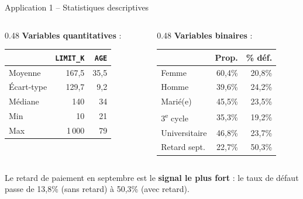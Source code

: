 \documentclass[11pt,aspectratio=169]{beamer}
\begin{document}
\begin{frame}{Application 1 -- Statistiques descriptives}

\begin{columns}[T]
\begin{column}{0.48\textwidth}
\textbf{Variables quantitatives} :
\smallskip

    \small
    \renewcommand{\arraystretch}{1.2}
    \begin{tabular}{lrr}
        \toprule
        & \texttt{LIMIT\_K} & \texttt{AGE} \\
        \midrule
        Moyenne & 167,5 & 35,5 \\
        Écart-type & 129,7 & 9,2 \\
        Médiane & 140 & 34 \\
        Min & 10 & 21 \\
        Max & 1\,000 & 79 \\
        \bottomrule
    \end{tabular}
\end{column}
\begin{column}{0.48\textwidth}
\textbf{Variables binaires} :
\smallskip

    \small
    \renewcommand{\arraystretch}{1.2}
    \begin{tabular}{lrr}
        \toprule
        & \textbf{Prop.} & \textbf{\% déf.} \\
        \midrule
        Femme & 60,4\% & 20,8\% \\
        Homme & 39,6\% & 24,2\% \\
        Marié(e) & 45,5\% & 23,5\% \\
        3\textsuperscript{e} cycle & 35,3\% & 19,2\% \\
        Universitaire & 46,8\% & 23,7\% \\
        Retard sept. & 22,7\% & 50,3\% \\
        \bottomrule
    \end{tabular}
\end{column}
\end{columns}

\bigskip

Le retard de paiement en septembre est le \textbf{signal le plus fort} :
le taux de défaut passe de 13,8\% (sans retard) à 50,3\% (avec retard).

\end{frame}
\end{document}
